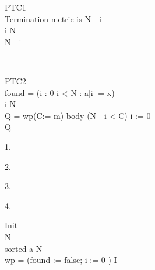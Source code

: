 \documentclass[fontsize=9p]{article}
\begin{document}
\noindent \begin{PROOF} {PTC1} \\
Termination metric is N - i \\
 {i \le N} \\
 { N - i } \\
\begin{BODY}
\item {} \\
\end{BODY}
\end{PROOF} 
\vspace{5mm}

\noindent \begin{PROOF} {PTC2} \\
 { found = (\exists i : 0 \le i < N : a[i] = x)} \\
 {i \le N } \\
 {Q = wp(C:= m) \: body \:(N - i < C) \: i := 0} \\
 { Q}
\begin{BODY}
\item[1.]  \\
\item[2.]  \\
\item[3.]  \\
\item[4.]  \\
\end{BODY}
\end{PROOF}
\vspace{5mm}

\noindent \begin{PROOF} {Init} \\
 {N } \\
 {sorted \:a \:N} \\
 {wp = (found := false;  i := 0 ) \: I} \\
\begin{BODY}
\item {} \\
\item {} \\
\item {} \\
\end{BODY}
\end{PROOF} 
\vspace{5mm}
\end{document}
